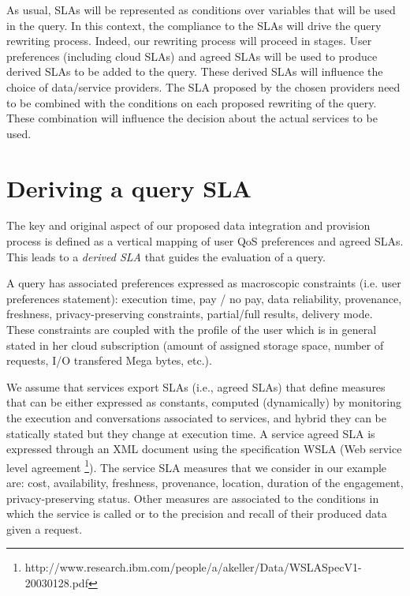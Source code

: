 As usual, SLAs will be represented as conditions over variables that will be used in the query.
In this context, the compliance to the SLAs will drive the query rewriting process.
Indeed, our rewriting process will proceed in stages.
User preferences (including cloud SLAs) and agreed SLAs will be used to produce derived SLAs to be added to the query. 
These derived SLAs will influence the choice of data/service providers.
The SLA proposed by the chosen providers need to be combined with the conditions on each proposed rewriting of the query.
These combination will influence the decision about the actual services to be used.

\section{Deriving a query SLA}
\label{sec:slaModel}

The key and original aspect of   our proposed data integration and provision process is  defined as a vertical mapping of user QoS preferences and agreed SLAs. This  leads to a {\em derived SLA} that guides the evaluation of a query. 

A query has associated preferences  expressed as macroscopic constraints (i.e. user preferences statement): execution time, pay / no pay, data reliability, provenance, freshness, privacy-preserving constraints, partial/full results, delivery mode. These constraints are coupled with the profile of the user which is in general stated in her cloud subscription (amount of assigned storage space, number of requests, I/O transfered Mega bytes, etc.). 

We assume that services export SLAs (i.e., agreed SLAs) that define measures   that can be either expressed as constants,  computed (dynamically) by monitoring the execution and conversations associated to services, and hybrid they can be statically stated  but they change at execution time.  A service  agreed SLA is expressed through an  XML document using the specification WSLA (Web service level agreement \footnote{\footnotesize http://www.research.ibm.com/people/a/akeller/\-Data/WSLASpecV1-20030128.pdf}). The service SLA measures  that we consider in our example are: cost, availability, freshness, provenance, location, duration of the engagement, privacy-preserving status. Other measures are associated to the conditions in which the service is called or to the precision and recall of their produced data given a request. 

